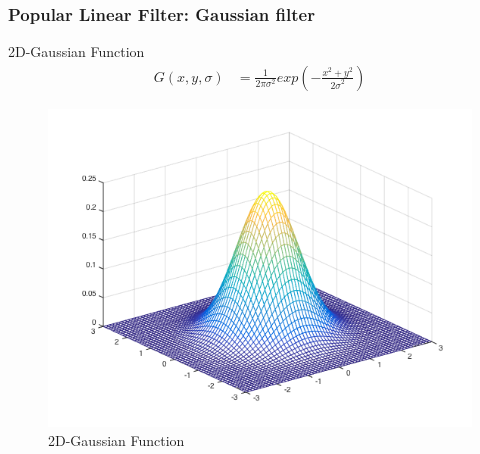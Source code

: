 \documentclass[english,11pt,table,handout]{beamer}
\begin{document}
\frame
{
	\frametitle{Popular Linear Filter: Gaussian filter}
	\begin{block}{2D-Gaussian Function}
		\begin{equation*}
		\begin{split}
				G(x,y, \sigma) &= \frac{1}{2\pi{\sigma}^2}  exp({-\frac{x^2 + y^2}{{2\sigma}^2}})
		\end{split}
		\end{equation*}
	\end{block}
	\begin{figure}
		\includegraphics[scale=0.3]{gaussian.png}
		\caption{2D-Gaussian Function}
	\end{figure}
}
\end{document}
